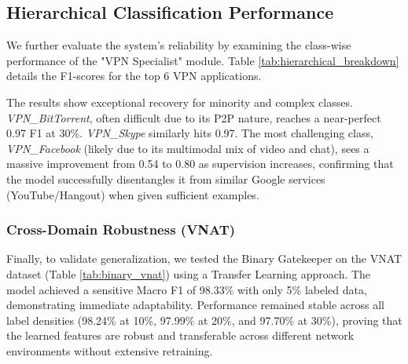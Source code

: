\subsection{Hierarchical Classification Performance}
\label{subsec:res_hierarchical}

We further evaluate the system's reliability by examining the class-wise performance of the "VPN Specialist" module. Table \ref{tab:hierarchical_breakdown} details the F1-scores for the top 6 VPN applications.

\begin{table}[htbp]
\caption{Stage 2: VPN Specialist Performance (Top-6 Apps, Macro F1)}
\label{tab:hierarchical_breakdown}
\centering
\scriptsize
\setlength{\tabcolsep}{3pt}
\end{table}

The results show exceptional recovery for minority and complex classes. \textit{VPN\_BitTorrent}, often difficult due to its P2P nature, reaches a near-perfect 0.97 F1 at 30\%. \textit{VPN\_Skype} similarly hits 0.97. The most challenging class, \textit{VPN\_Facebook} (likely due to its multimodal mix of video and chat), sees a massive improvement from 0.54 to 0.80 as supervision increases, confirming that the model successfully disentangles it from similar Google services (YouTube/Hangout) when given sufficient examples.

\subsubsection{Cross-Domain Robustness (VNAT)}
Finally, to validate generalization, we tested the Binary Gatekeeper on the VNAT dataset (Table \ref{tab:binary_vnat}) using a Transfer Learning approach. The model achieved a sensitive Macro F1 of 98.33\% with only 5\% labeled data, demonstrating immediate adaptability. Performance remained stable across all label densities (98.24\% at 10\%, 97.99\% at 20\%, and 97.70\% at 30\%), proving that the learned features are robust and transferable across different network environments without extensive retraining.

